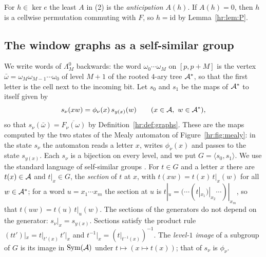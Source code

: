 For $h\in\ker e$ the least $A$ in (2) is the \emph{anticipation} $A(h)$. If $A(h)=0$, then $h$ is a cellwise permutation commuting with $F$, so $h=\mathrm{id}$ by Lemma~\ref{hr:lem:P}.

\subsection{The window graphs as a self-similar group}\label{hr:sec:tree}

We write words of $\Lambda^0_M$ backwards: the word $\omega_0\cdots\omega_M$ on $[p,p+M]$ is the vertex $\bar\omega=\omega_M\omega_{M-1}\cdots\omega_0$ of level $M+1$ of the rooted $4$-ary tree $\mathcal{A}^*$, so that the first letter is the cell next to the incoming bit. Let $s_0$ and $s_1$ be the maps of $\mathcal{A}^*$ to itself given by
\[
s_\nu(xw)=\phi_\nu(x)\,s_{y(x)}(w)\qquad(x\in\A,\ w\in\A^*),
\]
so that $s_\nu(\bar\omega)=\overline{F_\nu(\omega)}$ by Definition~\ref{hr:def:graphs}. These are the maps computed by the two states of the Mealy automaton of Figure~\ref{hr:fig:mealy}: in the state $s_\nu$ the automaton reads a letter $x$, writes $\phi_\nu(x)$ and passes to the state $s_{y(x)}$. Each $s_\nu$ is a bijection on every level, and we put $G=\langle s_0,s_1\rangle$. We use the standard language of self-similar groups \cite{Nekrashevych2005}. For $t\in G$ and a letter $x$ there are $t(x)\in\mathcal{A}$ and $t|_x\in G$, the \emph{section} of $t$ at $x$, with $t(xw)=t(x)\,t|_x(w)$ for all $w\in\mathcal{A}^*$; for a word $u=x_1\cdots x_m$ the section at $u$ is $t|_u=(\cdots(t|_{x_1})|_{x_2}\cdots)|_{x_m}$, so that $t(uw)=t(u)\,t|_u(w)$. The sections of the generators do not depend on the generator: $s_\nu|_x=s_{y(x)}$. Sections satisfy the product rule $(tt')|_x=t|_{t'(x)}\,t'|_x$ and $t^{-1}|_x=(t|_{t^{-1}(x)})^{-1}$. The \emph{level-$1$ image} of a subgroup of $G$ is its image in $\operatorname{Sym}(\mathcal{A})$ under $t\mapsto(x\mapsto t(x))$; that of $s_\nu$ is $\phi_\nu$.

